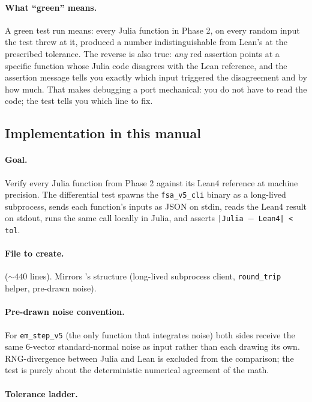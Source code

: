\documentclass[11pt,a4paper]{article}
\begin{document}
\paragraph{What ``green'' means.} A green test run means: every Julia
function in Phase 2, on every random input the test threw at it,
produced a number indistinguishable from Lean's at the prescribed
tolerance. The reverse is also true: \emph{any} red assertion
points at a specific function whose Julia code disagrees with the
Lean reference, and the assertion message tells you exactly which
input triggered the disagreement and by how much. That makes
debugging a port mechanical: you do not have to read the code; the
test tells you which line to fix.

\subsection{Implementation in this manual}

\paragraph{Goal.} Verify every Julia function from Phase 2 against
its Lean4 reference at machine precision. The differential test
spawns the \texttt{fsa\_v5\_cli} binary as a long-lived subprocess,
sends each function's inputs as JSON on stdin, reads the Lean4
result on stdout, runs the same call locally in Julia, and asserts
\texttt{|Julia $-$ Lean4| < tol}.

\paragraph{File to create.}
 ($\sim 440$
lines). Mirrors 's structure (long-lived
subprocess client, \texttt{round\_trip} helper, pre-drawn noise).

\paragraph{Pre-drawn noise convention.} For \texttt{em\_step\_v5} (the
only function that integrates noise) both sides receive the same
6-vector standard-normal noise as input rather than each drawing
its own. RNG-divergence between Julia and Lean is excluded from
the comparison; the test is purely about the deterministic
numerical agreement of the math.

\paragraph{Tolerance ladder.}
\end{document}
